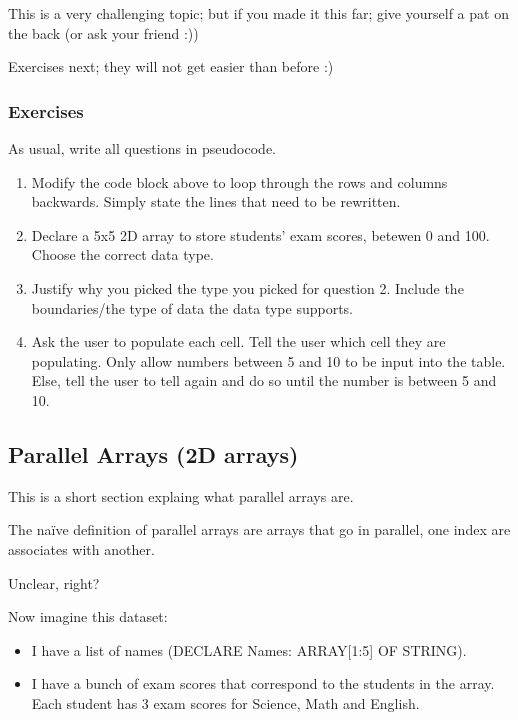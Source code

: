 \documentclass[./main.tex]{subfiles}
\begin{document}
This is a very challenging topic; but if you made it this far; give yourself a pat on the back (or ask your friend :))

Exercises next; they will not get easier than before :)

\newpage
\subsubsection{Exercises}
\label{ex:3_3_3}

As usual, write all questions in pseudocode.

\begin{enumerate}
    \item Modify the code block above to loop through the rows and columns backwards. Simply state the lines that need to be rewritten.
        \smalllines
    \item Declare a 5x5 2D array to store students' exam scores, betewen 0 and 100. Choose the correct data type.
        \smalllines
    \item Justify why you picked the type you picked for question 2. Include the boundaries/the type of data the data type supports.
        \mediumlines
    \item Ask the user to populate each cell. Tell the user which cell they are populating. Only allow numbers between 5 and 10 to be input into the table. Else, tell the user to tell again and do so until the number is between 5 and 10.
        \verylargelines
\end{enumerate}

\newpage
\subsection{Parallel Arrays (2D arrays)}

This is a short section explaing what parallel arrays are.

The naïve definition of parallel arrays are arrays that go in parallel, one index are associates with another.

Unclear, right?

Now imagine this dataset:

\begin{itemize}
    \item I have a list of names ({\ccmono DECLARE Names: ARRAY[1:5] OF STRING}).
    \item I have a bunch of exam scores that correspond to the students in the array. Each student has 3 exam scores for Science, Math and English.
\end{itemize}
\end{document}
